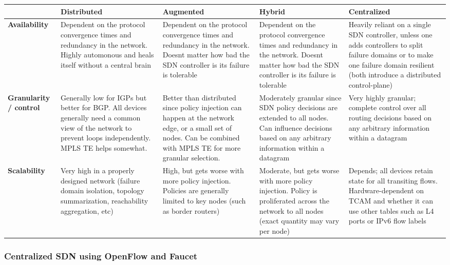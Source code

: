 \begin{longtable}{LLLLL}
\toprule
&
\textbf{Distributed}
&
\textbf{Augmented}
&
\textbf{Hybrid}
&
\textbf{Centralized}
\\ \midrule
\textbf{Availability}
&
Dependent on the protocol convergence times and redundancy in the network.
Highly automonous and heals itself without a central brain
&
Dependent on the protocol convergence times and redundancy in the network.
Doesnt matter how bad the SDN controller is its failure is tolerable
&
Dependent on the protocol convergence times and redundancy in the network.
Doesnt matter how bad the SDN controller is  its failure is tolerable
&
Heavily reliant on a single SDN controller, unless one adds controllers to
split failure domains or to make one failure domain resilient
(both introduce a distributed control-plane)
\\ \midrule
\textbf{Granularity / control}
&
Generally low for IGPs but better for BGP\@. All devices generally need a common
view of the network to prevent loops independently. MPLS TE helps somewhat.
&
Better than distributed since policy injection can happen at the network edge,
or a small set of nodes. Can be combined with MPLS TE for more granular selection.
&
Moderately granular since SDN policy decisions are extended to all nodes. Can
influence decisions based on any arbitrary information within a datagram
&
Very highly granular; complete control over all routing decisions based on any
arbitrary information within a datagram
\\ \midrule
\textbf{Scalability}
&
Very high in a properly designed network (failure domain isolation, topology
summarization, reachability aggregation, etc)
&
High, but gets worse with more policy injection. Policies are generally
limited to key nodes (such as border routers)
&
Moderate, but gets worse with more policy injection. Policy is proliferated
across the network to all nodes (exact quantity may vary per node)
&
Depends; all devices retain state for all transiting flows. Hardware-dependent
on TCAM and whether it can use other tables such as L4 ports or IPv6 flow
labels
\\
\bottomrule
\end{longtable}

\subsubsection{Centralized SDN using OpenFlow and Faucet}

